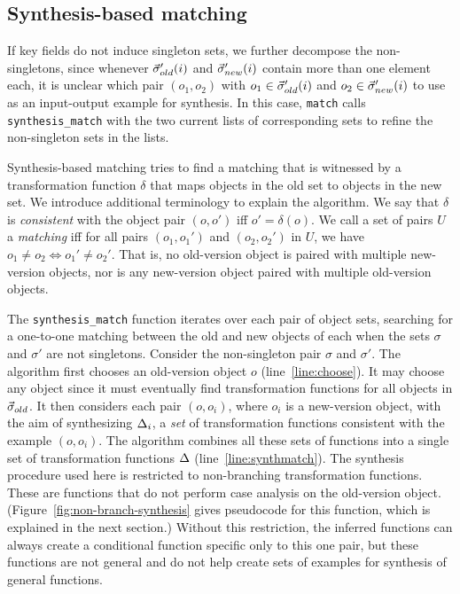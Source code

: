 \documentclass[natbib,10pt]{sigplanconf}
\newcommand{\code}[1]{\lstinline|#1|\xspace}
\begin{document}
\subsection{Synthesis-based matching}
\label{sec:synth-match}

If key fields do not induce singleton sets, we
further decompose the non-singletons, since whenever $\vec{\sigma}_{old}'(i)$ and
$\vec{\sigma}_{new}'(i)$ contain more than one element each, it is 
unclear which pair $(o_1,o_2)$ with $o_1 \in \vec{\sigma}_{old}'(i)$ and $o_2
\in \vec{\sigma}_{new}'(i)$ to use as an input-output example for synthesis.
In this case, \code{match} calls
\code{synthesis_match} with the two current lists of
corresponding sets to refine the non-singleton sets in the
lists.

Synthesis-based matching tries to find a matching that is 
witnessed by a transformation function $\delta$ that maps objects in the
old set to objects in the new set.  We introduce additional
terminology to explain the algorithm.  We say that $\delta$ is
\emph{consistent} with the object pair $(o,o')$ iff $o' = \delta(o)$.
We call a set of pairs $U$ a \emph{matching} iff for all pairs
$(o_1,o_1')$ and $(o_2, o_2')$ in $U$, we have $o_1 \neq o_2
\Leftrightarrow o_1' \neq o_2'$.  That is, no old-version object is
paired with multiple new-version objects, nor is any new-version
object paired with multiple old-version objects.  

The \code{synthesis_match} function iterates over each pair of
object sets, searching for a one-to-one matching between the old and new
objects of each when the sets $\sigma$ and $\sigma'$ are not
singletons.
Consider the non-singleton pair $\sigma$ and $\sigma'$. The algorithm
first chooses an old-version object $o$ (line~\ref{line:choose}).  It
may choose any object since it must eventually find transformation functions
for all objects in $\vec{\sigma}_{old}$. It then considers each pair
$(o,o_i)$, where $o_i$ is a new-version object, with the aim of
synthesizing $\Delta_i$, a \emph{set} of transformation functions consistent
with the example $(o,o_i)$. The algorithm combines all these sets of functions into a single
set of transformation functions $\Delta$  (line~\ref{line:synthmatch}). The synthesis
procedure used here is restricted to non-branching transformation functions.
These are functions that do not perform case analysis on the
old-version object.  (Figure~\ref{fig:non-branch-synthesis} gives
pseudocode for this function, which is explained in the next section.)
Without this restriction, the inferred functions can always 
create a conditional function specific only to this one pair, but
these functions are not general and do not help create sets of
examples for synthesis of general functions.
\end{document}
